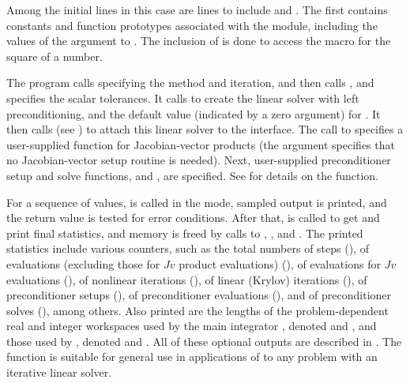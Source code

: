 Among the initial  lines in this case are lines to
include  and .  The first
contains constants and function prototypes associated with the
{\sunlinsolspgmr} module, including the values of the 
argument to . The inclusion of  is
done to access the  macro for the square of a 
number. 

The  program calls  specifying the  method
and  iteration, and then calls , and
 specifies the scalar tolerances.
It calls  to create the {\spgmr} linear solver with left
preconditioning, and the default value (indicated by a zero argument)
for .  It then calls  (see
) to attach this linear solver to the
{\cvspils} interface.  The call to  specifies a
user-supplied function for Jacobian-vector products (the 
argument specifies that no Jacobian-vector setup routine is needed). 
Next, user-supplied preconditioner setup and solve functions,
 and , are specified. See
 for details on the
 function.

For a sequence of  values,  is called in the
 mode, sampled output is printed, and the return value is
tested for error conditions.  After that,  is called
to get and print final statistics, and memory is freed by calls to
, , and .  The printed
statistics include various counters, such as the total numbers of steps
(), of  evaluations (excluding those for $Jv$ product
evaluations) (), of  evaluations for $Jv$ evaluations (),
of nonlinear iterations (), of linear (Krylov) iterations (),
of preconditioner setups (), of preconditioner evaluations
(), and of preconditioner solves (), among others.  
Also printed are the lengths of the problem-dependent real and integer
workspaces used by the main integrator , denoted  and
, and those used by {\cvspils}, denoted  and .
All of these optional outputs are described in .
The  function is suitable for general use in applications
of {\cvode} to any problem with an iterative linear solver.


